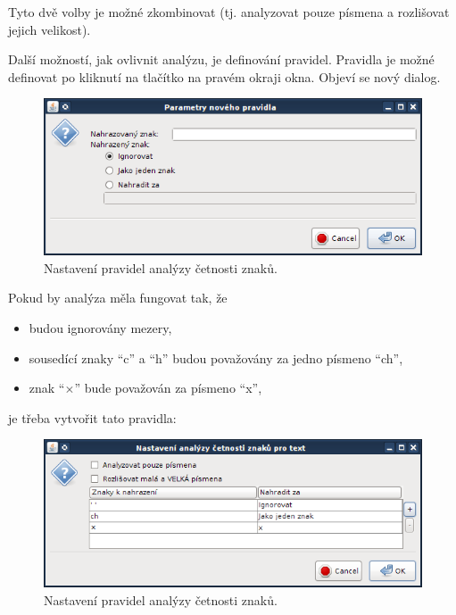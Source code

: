 \documentclass[dp.tex]{subfiles}
\begin{document}
Tyto dvě volby je možné zkombinovat (tj. analyzovat pouze písmena a rozlišovat jejich velikost).

Další možností, jak ovlivnit analýzu, je definování pravidel. Pravidla je možné definovat po kliknutí na tlačítko  na pravém okraji okna. Objeví se nový dialog.

\begin{figure}[H]
\centering
\includegraphics[max width=\textwidth,keepaspectratio=true]{imgs-60-aplikace/gui-character-analysis-rules-dialog}
\caption{Nastavení pravidel analýzy četnosti znaků.}
\label{fig:gui-character-analysis-rules-dialog}
\end{figure}

Pokud by analýza měla fungovat tak, že
\begin{itemize}
\item budou ignorovány mezery,
\item sousedící znaky \enquote{c} a \enquote{h} budou považovány za jedno písmeno \enquote{ch},
\item znak \enquote{$\times$} bude považován za písmeno \enquote{x},
\end{itemize}

je třeba vytvořit tato pravidla:

\begin{figure}[H]
\centering
\includegraphics[max width=\textwidth,keepaspectratio=true]{imgs-60-aplikace/gui-character-analysis-dialog-with-rules}
\caption{Nastavení pravidel analýzy četnosti znaků.}
\label{fig:gui-character-analysis-dialog-with-rules}
\end{figure}
\end{document}
